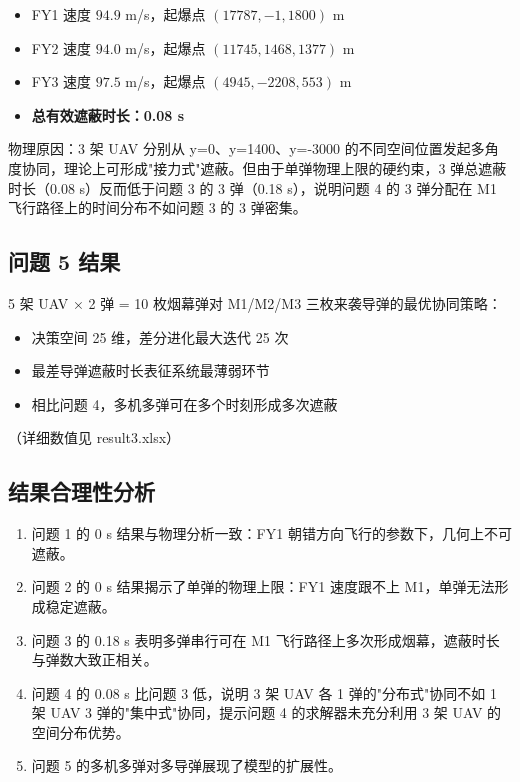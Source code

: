 \begin{itemize}
  \item FY1 速度 $94.9$ m/s，起爆点 $(17787, -1, 1800)$ m
  \item FY2 速度 $94.0$ m/s，起爆点 $(11745, 1468, 1377)$ m
  \item FY3 速度 $97.5$ m/s，起爆点 $(4945, -2208, 553)$ m
  \item \textbf{总有效遮蔽时长：0.08 s}
\end{itemize}

物理原因：3 架 UAV 分别从 y=0、y=1400、y=-3000 的不同空间位置发起多角度协同，理论上可形成"接力式"遮蔽。但由于单弹物理上限的硬约束，3 弹总遮蔽时长（0.08 s）反而低于问题 3 的 3 弹（0.18 s），说明问题 4 的 3 弹分配在 M1 飞行路径上的时间分布不如问题 3 的 3 弹密集。

\subsection{问题 5 结果}

5 架 UAV × 2 弹 = 10 枚烟幕弹对 M1/M2/M3 三枚来袭导弹的最优协同策略：

\begin{itemize}
  \item 决策空间 25 维，差分进化最大迭代 25 次
  \item 最差导弹遮蔽时长表征系统最薄弱环节
  \item 相比问题 4，多机多弹可在多个时刻形成多次遮蔽
\end{itemize}

（详细数值见 result3.xlsx）

\subsection{结果合理性分析}

\begin{enumerate}
  \item 问题 1 的 0 s 结果与物理分析一致：FY1 朝错方向飞行的参数下，几何上不可遮蔽。
  \item 问题 2 的 0 s 结果揭示了单弹的物理上限：FY1 速度跟不上 M1，单弹无法形成稳定遮蔽。
  \item 问题 3 的 0.18 s 表明多弹串行可在 M1 飞行路径上多次形成烟幕，遮蔽时长与弹数大致正相关。
  \item 问题 4 的 0.08 s 比问题 3 低，说明 3 架 UAV 各 1 弹的"分布式"协同不如 1 架 UAV 3 弹的"集中式"协同，提示问题 4 的求解器未充分利用 3 架 UAV 的空间分布优势。
  \item 问题 5 的多机多弹对多导弹展现了模型的扩展性。
\end{enumerate}

